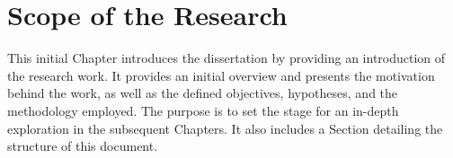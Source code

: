 





\ifpdf
    \graphicspath{{Content/figures/PNG/}{Content/figures/JPG/}{Content/figures/PDF/}{Content/figures/}}
\else
    \graphicspath{{Content/figures/EPS/}{Content/figures/}}
\fi

\chapter{Scope of the Research}
\label{chap:introduction}

This initial Chapter introduces the dissertation by providing an introduction of the research work. It provides an initial overview and presents the motivation behind the work, as well as the defined objectives, hypotheses, and the methodology employed. The purpose is to set the stage for an in-depth exploration in the subsequent Chapters. It also includes a Section detailing the structure of this document. 

